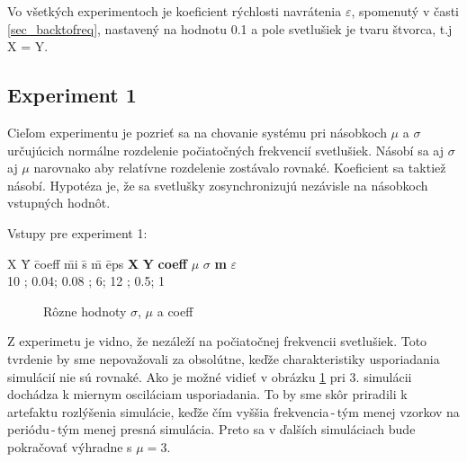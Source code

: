 \documentclass[a4paper, 11pt]{article}
\begin{document}
Vo všetkých experimentoch je koeficient rýchlosti navrátenia $\varepsilon$, spomenutý v časti \ref{sec_backtofreq}, nastavený na hodnotu 0.1 a pole svetlušiek je tvaru štvorca, t.j X = Y.

\subsection{Experiment 1}
Cieľom experimentu je pozrieť sa na chovanie systému pri násobkoch $\mu$ a $\sigma$ určujúcich normálne rozdelenie počiatočných frekvencií svetlušiek. Násobí sa aj $\sigma$ aj $\mu$  narovnako aby relatívne rozdelenie zostávalo rovnaké. Koeficient sa taktiež násobí. Hypotéza je, že sa svetlušky zosynchronizujú nezávisle na násobkoch vstupných hodnôt.

\noindent Vstupy pre experiment 1:
\begin{tabbing}
    X \quad \= Y \quad \= coeff \quad \quad \quad \quad \quad \= mi \quad \quad \quad \= s \quad \quad \quad \quad \quad \= m \quad \= eps \kill %
    \textbf{X} \> \textbf{Y} \> \textbf{coeff} \> \textbf{$\mu$} \> \textbf{$\sigma$} \> \textbf{m} \> \textbf{$\varepsilon$}\\ 
    10             ; 0.04; 0.08    ; 6; 12    ; 0.5; 1             
\end{tabbing}


\begin{figure}[h]
    \centering
\caption{Rôzne hodnoty $\sigma$, $\mu$ a coeff \label{Exp1F}}
\end{figure}

Z experimetu je vidno, že nezáleží na počiatočnej frekvencii svetlušiek. Toto tvrdenie by sme nepovažovali za obsolútne, keďže charakteristiky usporiadania simulácií nie sú rovnaké. Ako je možné vidieť v obrázku \ref{Exp1F} pri 3. simulácii dochádza k miernym osciláciam usporiadania. To by sme skôr priradili k artefaktu rozlýšenia simulácie, keďže čím vyššia frekvencia\,-\,tým menej vzorkov na periódu\,-\,tým menej presná simulácia. Preto sa v ďalších simuláciach bude pokračovať výhradne s $\mu = 3$.
\end{document}
